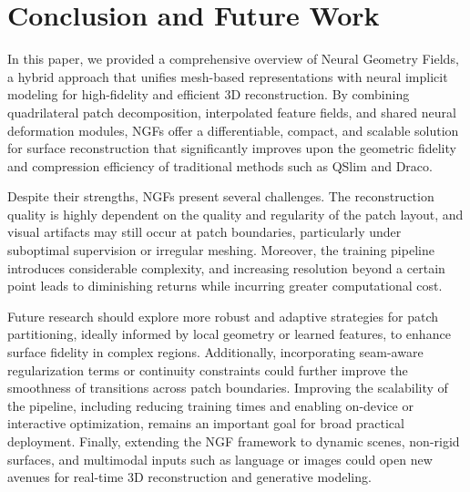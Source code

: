 \section{Conclusion and Future Work}\label{Sec:ConclusionAndFutureWork}

In this paper, we provided a comprehensive overview of Neural Geometry Fields, a hybrid approach that unifies mesh-based representations with neural implicit modeling for high-fidelity and efficient 3D reconstruction.
By combining quadrilateral patch decomposition, interpolated feature fields, and shared neural deformation modules, NGFs offer a differentiable, compact, and scalable solution for surface reconstruction that significantly improves upon the geometric fidelity and compression efficiency of traditional methods such as QSlim and Draco.

Despite their strengths, NGFs present several challenges.
The reconstruction quality is highly dependent on the quality and regularity of the patch layout, and visual artifacts may still occur at patch boundaries, particularly under suboptimal supervision or irregular meshing.
Moreover, the training pipeline introduces considerable complexity, and increasing resolution beyond a certain point leads to diminishing returns while incurring greater computational cost.

Future research should explore more robust and adaptive strategies for patch partitioning, ideally informed by local geometry or learned features, to enhance surface fidelity in complex regions.
Additionally, incorporating seam-aware regularization terms or continuity constraints could further improve the smoothness of transitions across patch boundaries.
Improving the scalability of the pipeline, including reducing training times and enabling on-device or interactive optimization, remains an important goal for broad practical deployment.
Finally, extending the NGF framework to dynamic scenes, non-rigid surfaces, and multimodal inputs such as language or images could open new avenues for real-time 3D reconstruction and generative modeling.
